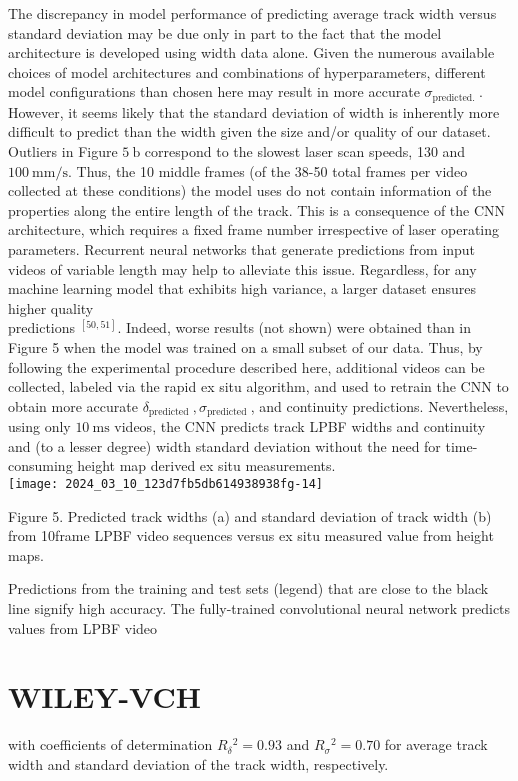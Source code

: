\documentclass[10pt]{article}
\begin{document}
The discrepancy in model performance of predicting average track width versus standard deviation may be due only in part to the fact that the model architecture is developed using width data alone. Given the numerous available choices of model architectures and combinations of hyperparameters, different model configurations than chosen here may result in more accurate $\sigma_{\text {predicted. }}$. However, it seems likely that the standard deviation of width is inherently more difficult to predict than the width given the size and/or quality of our dataset. Outliers in Figure $5 \mathrm{~b}$ correspond to the slowest laser scan speeds, 130 and $100 \mathrm{~mm} / \mathrm{s}$. Thus, the 10 middle frames (of the 38-50 total frames per video collected at these conditions) the model uses do not contain information of the properties along the entire length of the track. This is a consequence of the CNN architecture, which requires a fixed frame number irrespective of laser operating parameters. Recurrent neural networks that generate predictions from input videos of variable length may help to alleviate this issue. Regardless, for any machine learning model that exhibits high variance, a larger dataset ensures higher quality\\
predictions ${ }^{[50,51]}$. Indeed, worse results (not shown) were obtained than in Figure 5 when the model was trained on a small subset of our data. Thus, by following the experimental procedure described here, additional videos can be collected, labeled via the rapid ex situ algorithm, and used to retrain the $\mathrm{CNN}$ to obtain more accurate $\delta_{\text {predicted }}, \sigma_{\text {predicted }}$, and continuity predictions. Nevertheless, using only $10 \mathrm{~ms}$ videos, the CNN predicts track LPBF widths and continuity and (to a lesser degree) width standard deviation without the need for time-consuming height map derived ex situ measurements.\\
\texttt{[image: 2024\_03\_10\_123d7fb5db614938938fg-14]}

Figure 5. Predicted track widths (a) and standard deviation of track width (b) from 10frame LPBF video sequences versus ex situ measured value from height maps.

Predictions from the training and test sets (legend) that are close to the black line signify high accuracy. The fully-trained convolutional neural network predicts values from LPBF video

\section*{WILEY-VCH}
with coefficients of determination $R_{\delta}{ }^{2}=0.93$ and $R_{\sigma}{ }^{2}=0.70$ for average track width and standard deviation of the track width, respectively.
\end{document}
